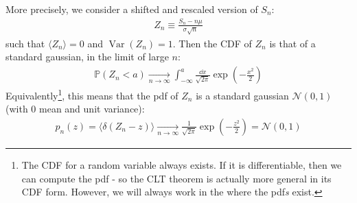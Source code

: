\documentclass[../../main.tex]{subfiles}
\begin{document}
\medskip

More precisely, we consider a shifted and rescaled version of $S_n$:
\begin{align*}
    Z_n \equiv \frac{S_n - n \mu}{\sigma\sqrt{n}} 
\end{align*}
such that $\langle Z_n \rangle = 0$ and $\operatorname{Var}(Z_n) = 1$. Then the CDF of $Z_n$ is that of a standard gaussian, in the limit of large $n$:
\begin{align*}
    \mathbb{P}(Z_n < a)  \xrightarrow[n \to \infty]{}  \int_{-\infty}^a \frac{\dd{x}}{\sqrt{2 \pi}}  \exp\left(-\frac{x^2}{2} \right) 
\end{align*} 
Equivalently\footnote{The CDF for a random variable always exists. If it is differentiable, then we can compute the pdf - so the CLT theorem is actually more general in its CDF form. However, we will always work in the  where the pdf\textit{s}  exist.},%
 this means that the pdf of $Z_n$ is a standard gaussian $\mathcal{N}(0,1)$ (with $0$ mean and unit variance):
\begin{align*}
    p_n(z) = \langle \delta(Z_n - z)  \rangle  \xrightarrow[n \to \infty]{}  \frac{1}{\sqrt{2 \pi}} \exp\left(-\frac{z^2}{2} \right) = \mathcal{N}(0,1)
\end{align*}

\medskip
\end{document}
